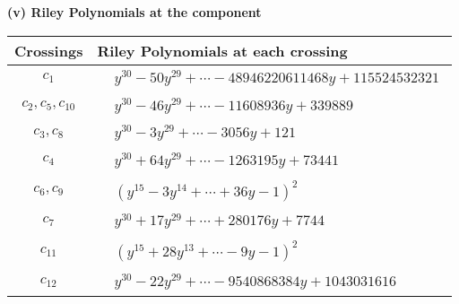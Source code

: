 \documentclass[1p]{elsarticle_modified}
\theoremstyle{definition}
\begin{document}
\newpage\renewcommand{\arraystretch}{1}
\flushleft \textbf{(v) Riley Polynomials at the component}\newline \\
\begin{tabular}{m{50pt}|m{274pt}}
Crossings & \hspace{64pt}Riley Polynomials at each crossing \\
\hline $$\begin{aligned}c_{1}\end{aligned}$$&$\begin{aligned}
&y^{30}-50 y^{29}+\cdots-48946220611468 y+115524532321
\end{aligned}$\\
\hline $$\begin{aligned}c_{2},c_{5},c_{10}\end{aligned}$$&$\begin{aligned}
&y^{30}-46 y^{29}+\cdots-11608936 y+339889
\end{aligned}$\\
\hline $$\begin{aligned}c_{3},c_{8}\end{aligned}$$&$\begin{aligned}
&y^{30}-3 y^{29}+\cdots-3056 y+121
\end{aligned}$\\
\hline $$\begin{aligned}c_{4}\end{aligned}$$&$\begin{aligned}
&y^{30}+64 y^{29}+\cdots-1263195 y+73441
\end{aligned}$\\
\hline $$\begin{aligned}c_{6},c_{9}\end{aligned}$$&$\begin{aligned}
&(y^{15}-3 y^{14}+\cdots+36 y-1)^{2}
\end{aligned}$\\
\hline $$\begin{aligned}c_{7}\end{aligned}$$&$\begin{aligned}
&y^{30}+17 y^{29}+\cdots+280176 y+7744
\end{aligned}$\\
\hline $$\begin{aligned}c_{11}\end{aligned}$$&$\begin{aligned}
&(y^{15}+28 y^{13}+\cdots-9 y-1)^{2}
\end{aligned}$\\
\hline $$\begin{aligned}c_{12}\end{aligned}$$&$\begin{aligned}
&y^{30}-22 y^{29}+\cdots-9540868384 y+1043031616
\end{aligned}$\\
\hline
\end{tabular}\\~\\
\end{document}
